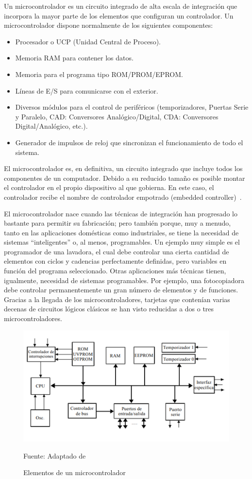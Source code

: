 Un microcontrolador es un circuito integrado de alta escala de integración que incorpora la mayor parte de los elementos que configuran un controlador. Un microcontrolador dispone normalmente de los siguientes componentes:
\begin{itemize}
    \item Procesador o UCP (Unidad Central de Proceso).
    \item Memoria RAM para contener los datos.
    \item Memoria para el programa tipo ROM/PROM/EPROM.
    \item Líneas de E/S para comunicarse con el exterior.
    \item Diversos módulos para el control de periféricos (temporizadores, Puertas Serie y Paralelo, CAD: Conversores Analógico/Digital, CDA: Conversores Digital/Analógico, etc.).
    \item Generador de impulsos de reloj que sincronizan el funcionamiento de todo el sistema.
\end{itemize}

El microcontrolador es, en definitiva, un circuito integrado que incluye todos los componentes de un computador. Debido a su reducido tamaño es posible montar el controlador en el propio dispositivo al que gobierna. En este caso, el controlador recibe el nombre de controlador empotrado (embedded controller)~\cite{microcontroladores}.

El microcontrolador nace cuando las técnicas de integración han progresado lo bastante para permitir su fabricación; pero también porque, muy a menudo, tanto en las aplicaciones domésticas como industriales, se tiene la necesidad de sistemas “inteligentes” o, al menos, programables. Un ejemplo muy simple es el programador de una lavadora, el cual debe controlar una cierta cantidad de elementos con ciclos y cadencias perfectamente definidas, pero variables en función del programa seleccionado. Otras aplicaciones más técnicas tienen, igualmente, necesidad de sistemas programables. Por ejemplo, una fotocopiadora debe controlar permanentemente un gran número de elementos y de funciones. Gracias a la llegada de los microcontroladores, tarjetas que contenían varias decenas de circuitos lógicos clásicos se han visto reducidas a dos o tres microcontroladores.

\begin{figure}[H]
    \centering
    \includegraphics[scale = 0.95]{Imagenes/CAP2_elementos_microcontrolador.png}
    \caption{Elementos de un microcontrolador}{Fuente: Adaptado de~\cite{microcontroladores}}
\end{figure}
